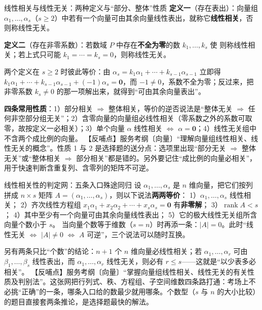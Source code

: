 \begin{fdeep}{线性相关与线性无关：两种定义与“部分、整体”性质}
\textbf{定义一}（存在表出）：向量组 $\alpha_1,\dots,\alpha_s$（$s\ge2$）中若有一个向量可由其余向量线性表出，就称它\textbf{线性相关}，否则称线性无关。

\textbf{定义二}（存在非零系数）：若数域 $P$ 中存在\textbf{不全为零}的数 $k_1,\dots,k_s$ 使
则称线性相关；若上式只可能 $k_1=\cdots=k_s=0$，则称线性无关。

两个定义在 $s\ge2$ 时彼此等价：由 $\alpha_s=k_1\alpha_1+\cdots+k_{s-1}\alpha_{s-1}$ 立即得 $k_1\alpha_1+\cdots+k_{s-1}\alpha_{s-1}+(-1)\alpha_s=\mathbf{0}$，而 $-1\ne0$，系数不全为零；反过来，把非零系数 $k_s\ne0$ 的那一项解出来，就得到“可由其余向量表出”。

\textbf{四条常用性质}：1）部分相关 $\Longrightarrow$ 整体相关，等价的逆否说法是“整体无关 $\Longrightarrow$ 任何非空部分组无关”；2）含零向量的向量组必线性相关（零系数之外的系数可取零，故按定义一必相关）；3）单个向量 $\alpha$ 线性相关 $\iff$ $\alpha=\mathbf{0}$；4）线性无关组中不含两个成比例的向量。
【反哺点】服务考纲〔向量〕“理解向量组线性相关、线性无关的概念”。性质 1 与 2 是选择题的送分点：选项里出现“部分无关 $\Rightarrow$ 整体无关”或“整体相关 $\Rightarrow$ 部分相关”都是错的。另外要记住“成比例的向量必相关”，用于快速判断含重复列、含零列的矩阵不可逆。
\end{fdeep}

\begin{fdeep}{线性相关性的判定网：五条入口殊途同归}
设 $\alpha_1,\dots,\alpha_s$ 是 $n$ 维向量，把它们按列拼成 $n\times s$ 矩阵 $A=(\alpha_1,\dots,\alpha_s)$，则以下说法\textbf{两两等价}：
1）$\alpha_1,\dots,\alpha_s$ 线性相关；
2）齐次线性方程组 $x_1\alpha_1+x_2\alpha_2+\cdots+x_s\alpha_s=\mathbf{0}$ 有\textbf{非零解}；
3）$\operatorname{rank}A<s$；
4）其中至少有一个向量可由其余向量线性表出；
5）它的极大线性无关组所含向量个数小于 $s$。
当向量个数等于维数（$s=n$）时再添一条：$|A|=0$。此时“线性无关 $\iff$ $|A|\ne0$ $\iff$ $A$ 可逆”，三个说法可以随时互换。

另有两条只比“个数”的结论：$n+1$ 个 $n$ 维向量必线性相关；若 $\alpha_1,\dots,\alpha_r$ 可由 $\beta_1,\dots,\beta_s$ 线性表出，而 $\alpha_1,\dots,\alpha_r$ 线性无关，则必有 $r\le s$——这就是“以少表多必相关”。
【反哺点】服务考纲〔向量〕“掌握向量组线性相关、线性无关的有关性质及判别法”。这张网把行列式、秩、方程组、子空间维数四条路打通：考场上不必挑“正确”的一条，哪条入口给的数最少就用哪条。个数型（$s$ 与 $n$ 的大小比较）的题目直接套两条推论，是选择题最快的解法。
\end{fdeep}

